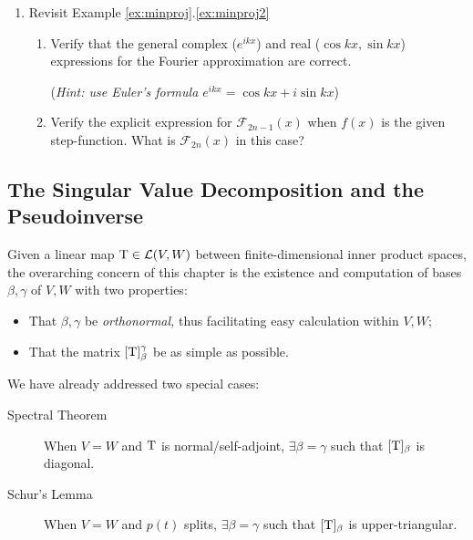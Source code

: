 \begin{exercises}
\begin{enumerate}
		
		\item Revisit Example \ref*{ex:minproj}.\ref{ex:minproj2}
		\begin{enumerate}
		  \item Verify that the general complex ($e^{ikx}$) and real ($\cos kx,\sin kx$) expressions for the Fourier approximation are correct.\par
		  (\emph{Hint: use Euler's formula $e^{ikx}=\cos kx+i\sin kx$})
		  \item Verify the explicit expression for $\mathcal F_{2n-1}(x)$ when $f(x)$ is the given step-function. What is $\mathcal F_{2n}(x)$ in this case?
		\end{enumerate}
	\end{enumerate}
\end{exercises}
	


\clearpage
	

\subsection{The Singular Value Decomposition and the Pseudoinverse}\label{sec:svd}


Given a linear map $\mathrm{T}\in\mathcal{L}(V,W)$ between finite-dimensional inner product spaces, the overarching concern of this chapter is the existence and computation of bases $\beta,\gamma$ of $V,W$ with two properties:
\begin{itemize}
  \item That $\beta,\gamma$ be \emph{orthonormal,} thus facilitating easy calculation within $V,W$;
  \item That the matrix $[\mathrm{T}]_\beta^\gamma$ be as simple as possible.
\end{itemize}

We have already addressed two special cases:
\begin{description}
	\item[Spectral Theorem] When $V=W$ and $\mathrm{T}$ is normal/self-adjoint, $\exists\beta=\gamma$ such that $[\mathrm{T}]_\beta$ is diagonal.
	\item[Schur's Lemma] When $V=W$ and $p(t)$ splits, $\exists\beta=\gamma$ such that $[\mathrm{T}]_\beta$ is upper-triangular.	
\end{description}


